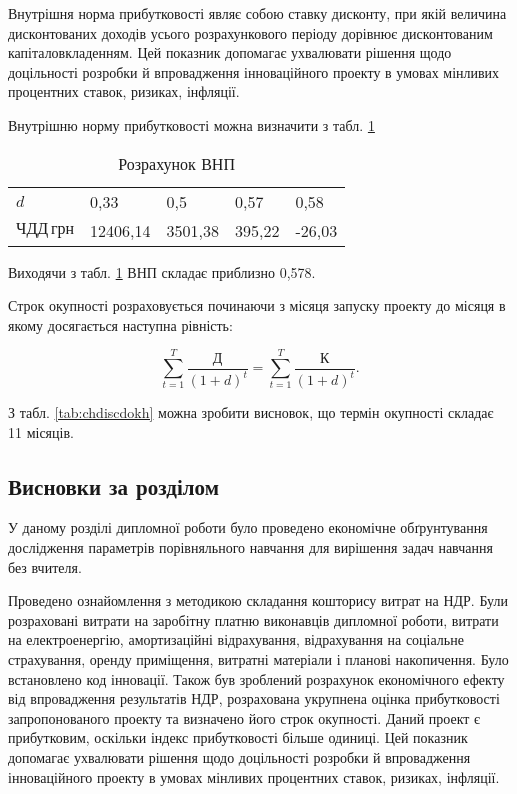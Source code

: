 Внутрішня норма прибутковості являє собою ставку дисконту, при якій величина дисконтованих доходів усього розрахункового періоду дорівнює дисконтованим капіталовкладенням. Цей показник допомагає ухвалювати рішення щодо доцільності розробки й впровадження інноваційного проекту в умовах мінливих процентних ставок, ризиках, інфляції.

Внутрішню норму прибутковості можна визначити з табл. \ref{tab:vnp}

\begin{table}[h!]
	\captionstyle{ \raggedright}
	\caption{Розрахунок ВНП}\label{tab:vnp}
	\begin{tabular}{| p{} | p{} | p{} | p{} | p{} |}
		\hline
		$d$ & 0,33 & 0,5 & 0,57 & 0,58 \\
		\hlinewd{2pt}
		$\text{ЧДД} \, \text{грн}$ & 12406,14 & 3501,38 & 395,22 & -26,03 \\
		\hline
	\end{tabular}
\end{table}

Виходячи з табл. \ref{tab:vnp} ВНП складає приблизно 0,578.

Строк окупності розраховується починаючи з місяця запуску проекту до місяця в якому досягається наступна рівність:

\begin{equation}\label{eq:economy16}
	\sum_{t=1}^{T}\frac{\text{Д}}{(1 + d)^{t}} = \sum_{t=1}^{T}\frac{\text{К}}{(1 + d)^{t}}.
\end{equation}

\vspace{1.5em}

З табл. \ref{tab:chdiscdokh} можна зробити висновок, що термін окупності складає 11 місяців.

\vspace{1.5em}

\subsection{Висновки за розділом}

У даному розділі дипломної роботи було проведено економічне обґрунтування дослідження параметрів порівняльного навчання для вирішення задач навчання без вчителя.

Проведено ознайомлення з методикою складання кошторису витрат на НДР. Були розраховані витрати на заробітну платню виконавців дипломної роботи, витрати на електроенергію, амортизаційні відрахування, відрахування на соціальне страхування, оренду приміщення, витратні матеріали і планові накопичення. Було встановлено код інновації. Також був зроблений розрахунок економічного ефекту від впровадження результатів НДР, розрахована укрупнена оцінка прибутковості запропонованого проекту та визначено його строк окупності. Даний проект є прибутковим, оскільки індекс прибутковості більше одиниці. Цей показник допомагає ухвалювати рішення щодо доцільності розробки й впровадження інноваційного проекту в умовах мінливих процентних ставок, ризиках, інфляції.


